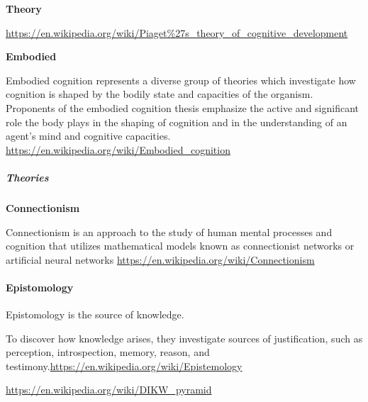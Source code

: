 \documentclass{book}
\providecommand{\ProjectDeepHeading}[2]{%
    \par\medskip\noindent\textbf{#2}\par\smallskip
}
\begin{document}
\ProjectDeepHeading{2}{Theory}


\url{https://en.wikipedia.org/wiki/Piaget%27s_theory_of_cognitive_development}
    \\
    \url{}

\ProjectDeepHeading{3}{Embodied}


Embodied cognition represents a diverse group of theories which investigate how cognition is shaped by the bodily state and capacities of the organism. Proponents of the embodied cognition thesis emphasize the active and significant role the body plays in the shaping of cognition and in the understanding of an agent's mind and cognitive capacities.
    \url{https://en.wikipedia.org/wiki/Embodied_cognition}
    

\subparagraph{Theories}

\ProjectDeepHeading{1}{Connectionism}


Connectionism is an approach to the study of human mental processes and cognition that utilizes mathematical models known as connectionist networks or artificial neural networks \url{https://en.wikipedia.org/wiki/Connectionism}

\paragraph{Epistomology}


Epistomology is the source of knowledge.
    
    To discover how knowledge arises, they investigate sources of justification, such as perception, introspection, memory, reason, and testimony.\url{https://en.wikipedia.org/wiki/Epistemology}


\url{https://en.wikipedia.org/wiki/DIKW_pyramid}
\end{document}
